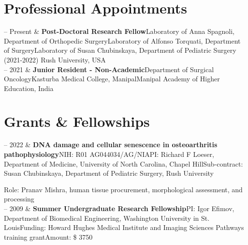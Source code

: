 \documentclass[10pt, letterpaper]{article}
\newcommand{\WASHU}{Washington University in St. Louis}
\newcommand{\KMC}{Kasturba Medical College, Manipal}
\newcommand{\MAHE}{Manipal Academy of Higher Education}
\newcommand{\RUSH}{Rush University}
\newcommand{\RUORTHO}{Department of Orthopedic Surgery}
\newcommand{\RUPEDS}{Department of Pediatric Surgery}
\newcommand{\RUSURG}{Department of Surgery}
\newcommand{\SURGONC}{Department of Surgical Oncology}
\newcommand{\Duration}[2]{\fontsize{9pt}{0}\selectfont #1 -- #2}
\newcommand{\Ongoing}{Present} %
\newcommand{\Appointment}[4]{\textbf{#1}\newline  #2\newline  #3\newline  #4}
\begin{document}
\section{Professional Appointments}

\begin{EntriesTable}
  \Duration{2021}{\Ongoing}  &
  \Appointment{Post-Doctoral Research Fellow}
  {Laboratory of Anna Spagnoli, {\RUORTHO}}
  {Laboratory of Alfonso Torquati, {\RUSURG}}
  {Laboratory of Susan Chubinskaya, {\RUPEDS} (2021-2022)}\newline
  {\RUSH, USA}
  \\
  \Duration{2021}{2021}  &
  \Appointment{Junior Resident - Non-Academic}{\SURGONC}{\KMC}{\MAHE, India}
\end{EntriesTable}




\section{Grants \& Fellowships}

\begin{EntriesTable}

  \Duration{2021}{2022}  &
  \Appointment{DNA damage and cellular senescence in osteoarthritis pathophysiology}
  {NIH: R01 AG044034/AG/NIA}
  {PI: Richard F Loeser, Department of Medicine, University of North Carolina, Chapel Hill}
  {Sub-contract: Susan Chubinskaya, {\RUPEDS}, {\RUSH}}
  
  {Role: Pranav Mishra, human tissue procurement, morphological assessment, and processing}
  \\
  \Duration{2009}{2009}  &
  \Appointment{Summer Undergraduate Research Fellowship}
  {PI: Igor Efimov, Department of Biomedical Engineering, {\WASHU}}
  {Funding: Howard Hughes Medical Institute and Imaging Sciences Pathways training grant}
  {Amount: \$ 3750}

\end{EntriesTable}
\end{document}
